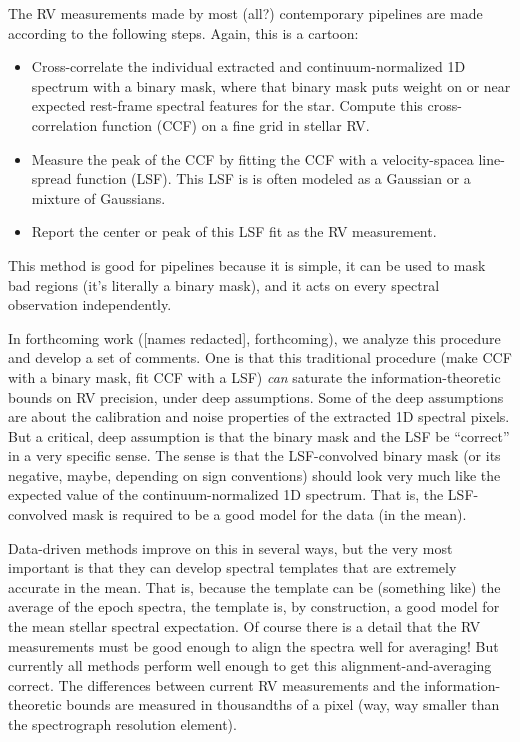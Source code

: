 \documentclass[12pt]{article}
\begin{document}
The RV measurements made by most (all?) contemporary pipelines are made according to the following steps. Again, this is a cartoon:
\begin{itemize}
    \item Cross-correlate the individual extracted and continuum-normalized 1D spectrum with a binary mask, where that binary mask puts weight on or near expected rest-frame spectral features for the star. Compute this cross-correlation function (CCF) on a fine grid in stellar RV.
    \item Measure the peak of the CCF by fitting the CCF with a velocity-spacea line-spread function (LSF). This LSF is is often modeled as a Gaussian or a mixture of Gaussians.
    \item Report the center or peak of this LSF fit as the RV measurement.
\end{itemize}
This method is good for pipelines because it is simple, it can be used to mask bad regions (it's literally a binary mask), and it acts on every spectral observation independently.

In forthcoming work ([names redacted], forthcoming), we analyze this procedure and develop a set of comments.
One is that this traditional procedure (make CCF with a binary mask, fit CCF with a LSF) \emph{can} saturate the information-theoretic bounds on RV precision, under deep assumptions.
Some of the deep assumptions are about the calibration and noise properties of the extracted 1D spectral pixels.
But a critical, deep assumption is that the binary mask and the LSF be ``correct'' in a very specific sense.
The sense is that the LSF-convolved binary mask (or its negative, maybe, depending on sign conventions) should look very much like the expected value of the continuum-normalized 1D spectrum.
That is, the LSF-convolved mask is required to be a good model for the data (in the mean).

Data-driven methods improve on this in several ways, but the very most important is that they can develop spectral templates that are extremely accurate in the mean.
That is, because the template can be (something like) the average of the epoch spectra, the template is, by construction, a good model for the mean stellar spectral expectation.
Of course there is a detail that the RV measurements must be good enough to align the spectra well for averaging!
But currently all methods perform well enough to get this alignment-and-averaging correct.
The differences between current RV measurements and the information-theoretic bounds are measured in thousandths of a pixel (way, way smaller than the spectrograph resolution element).
\end{document}
